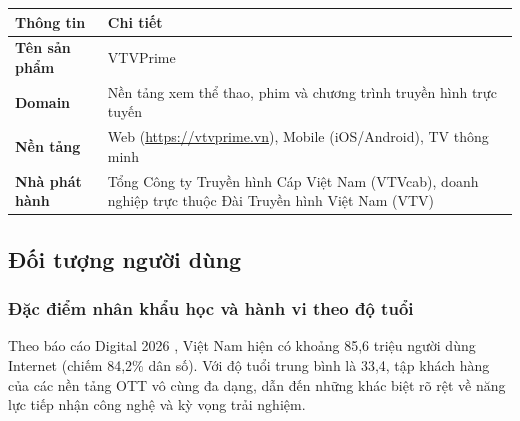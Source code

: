 \begin{center}
\begin{tabularx}{\textwidth}{|l|X|}
\hline
\textbf{Thông tin} & \textbf{Chi tiết} \\
\hline
\textbf{Tên sản phẩm} & VTVPrime \\
\hline
\textbf{Domain} & Nền tảng xem thể thao, phim và chương trình truyền hình trực tuyến \\
\hline
\textbf{Nền tảng} & Web (\url{https://vtvprime.vn}), Mobile (iOS/Android), TV thông minh \\
\hline
\textbf{Nhà phát hành} & Tổng Công ty Truyền hình Cáp Việt Nam (VTVcab), doanh nghiệp trực thuộc Đài Truyền hình Việt Nam (VTV) \\
\hline
\end{tabularx}          %
\end{center}

\subsection{Đối tượng người dùng}

\subsubsection{Đặc điểm nhân khẩu học và hành vi theo độ tuổi}

Theo báo cáo Digital 2026 \cite{datareportal2026}, Việt Nam hiện có khoảng 85,6 triệu người dùng Internet (chiếm 84,2\% dân số). Với độ tuổi trung bình là 33,4, tập khách hàng của các nền tảng OTT vô cùng đa dạng, dẫn đến những khác biệt rõ rệt về năng lực tiếp nhận công nghệ và kỳ vọng trải nghiệm.

\begin{center}
\end{center}

